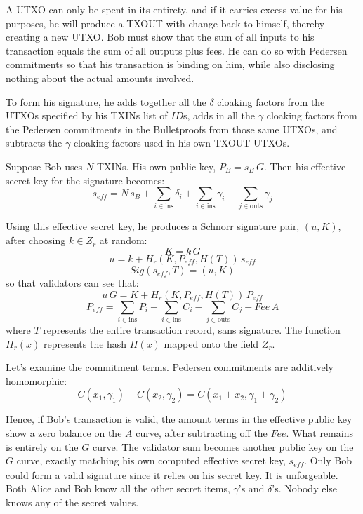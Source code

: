 \documentclass[8pt,fleqn,openany]{book}
\begin{document}
{		A UTXO can only be spent in its entirety, and if it carries excess value for his purposes, he will produce a TXOUT with change back to himself, thereby creating a new UTXO. Bob must show that the sum of all inputs to his transaction equals the sum of all outputs plus fees. He can do so with Pedersen commitments so that his transaction is binding on him, while also disclosing nothing about the actual amounts involved.
		
		To form his signature, he adds together all the $\delta$ cloaking factors from the UTXOs specified by his TXINs list of $\mathit{ID}$s, adds in all the $\gamma$ cloaking factors from the Pedersen commitments in the Bulletproofs from those same UTXOs, and subtracts the $\gamma$ cloaking factors used in his own TXOUT UTXOs. 
		
		Suppose Bob uses $N$ TXINs. His own public key, $P_B = s_B \, G$. Then his effective secret key for the signature becomes:
		$$s_{\mathit{eff}} = N \, s_B + \sum_{i \in \text{ins}} {\delta_i} + \sum_{i \in \text{ins}}{\gamma_i} - \sum_{j \in \text{outs}}{ \gamma_j}$$
		
		Using this effective secret key, he produces a Schnorr signature pair, $(u, K)$, after choosing $k \in Z_r$ at random:
		$$K = k \, G$$
		$$u = k + H_r(K, P_{eff}, H(T)) \, s_{\mathit{eff}}$$
		$$Sig(s_{eff},T) = (u, K)$$
		so that validators can see that:
		$$u \, G = K + H_r(K, P_{eff}, H(T)) \, P_{eff}$$
		$$P_{\mathit{eff}} = \sum_{i \in \text{ins}}{P_i} + \sum_{i \in \text{ins}}{C_i} - \sum_{j \in \text{outs}}{C_j} - \mathit{Fee} \, A$$
		where $T$ represents the entire transaction record, sans signature. The function $H_r(x)$ represents the hash $H(x)$ mapped onto the field $Z_r$.
		
		Let’s examine the commitment terms. Pedersen commitments are additively homomorphic:
		$$C(x_1, \gamma_1) + C(x_2, \gamma_2) = C(x_1 + x_2, \gamma_1 + \gamma_2)$$
		
		Hence, if Bob’s transaction is valid, the amount terms in the effective public key show a zero balance on the $A$ curve, after subtracting off the $\mathit{Fee}$. What remains is entirely on the $G$ curve. The validator sum becomes another public key on the $G$ curve, exactly matching his own computed effective secret key, $s_{\mathit{eff}}$. Only Bob could form a valid signature since it relies on his secret key. It is unforgeable. Both Alice and Bob know all the other secret items, $\gamma$’s and $\delta$’s. Nobody else knows any of the secret values.
		
}
\end{document}

